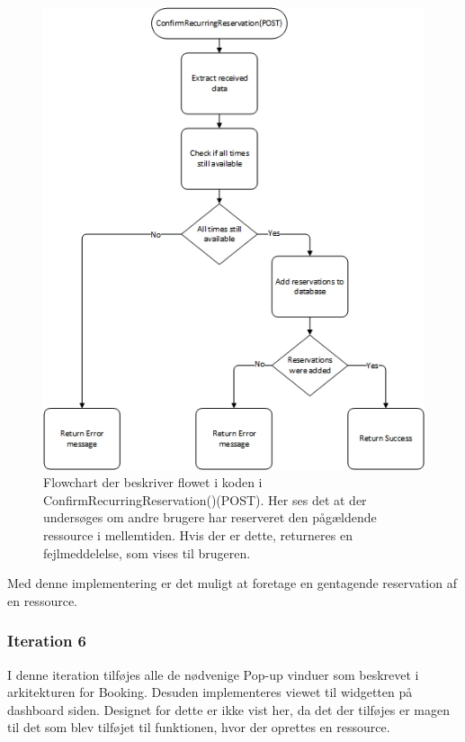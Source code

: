 \begin{figure}[H]
  \includegraphics[width=0.8\linewidth]{01_Billeder/10_Design_og_implementering/Booking/Flowchart_ServerConfirmReservation.jpg}
  \centering
  \caption{Flowchart der beskriver flowet i koden i ConfirmRecurringReservation()(POST). Her ses det at der undersøges om andre brugere har reserveret den pågældende ressource i mellemtiden. Hvis der er dette, returneres en fejlmeddelelse, som vises til brugeren.}
  \label{fig:Booking_FlowConfirmRecurring}
\end{figure}
 Med denne implementering er det muligt at foretage en gentagende reservation af en ressource. 

\subsubsection{Iteration 6}
I denne iteration tilføjes alle de nødvenige Pop-up vinduer som beskrevet i arkitekturen for Booking. Desuden implementeres viewet til widgetten på dashboard siden. Designet for dette er ikke vist her, da det der tilføjes er magen til det som blev tilføjet til funktionen, hvor der oprettes en ressource.

